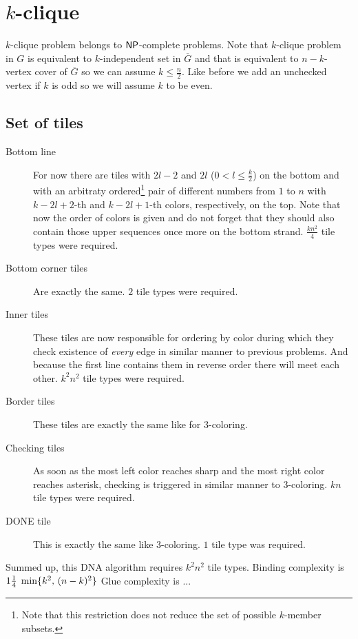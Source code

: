 \section{$k$-clique}


$k$-clique problem belongs to $\mathsf{NP}$-complete problems. Note that $k$-clique problem in $G$ is equivalent to $k$-independent set in $\overline{G}$ and that is equivalent to $n-k$-vertex cover of $\overline{G}$ so we can assume $k \leq \frac{n}{2}$. Like before we add an unchecked vertex if $k$ is odd so we will assume $k$ to be even. %

\subsection*{Set of tiles}

\begin{description}
	\item[Bottom line] For now there are tiles with $2l-2$ and $2l$ ($0 < l \leq \frac{k}{2}$) on the bottom and with an arbitraty ordered\footnote{Note that this restriction does not reduce the set of possible $k$-member subsets.} pair of different numbers from $1$ to $n$ with $k-2l+2$-th and $k-2l+1$-th colors, respectively, on the top. Note that now the order of colors is given and do not forget that they should also contain those upper sequences once more on the bottom strand. $\frac{kn^2}{4}$ tile types were required. %
	\item[Bottom corner tiles] Are exactly the same. $2$ tile types were required.
	\item[Inner tiles] These tiles are now responsible for ordering by color during which they check existence of {\em every} edge in similar manner to previous problems. And because the first line contains them in reverse order there will meet each other. $k^2 n^2$ tile types were required. %
	\item[Border tiles] These tiles are exactly the same like for 3-coloring.
	\item[Checking tiles] As soon as the most left color reaches sharp and the most right color reaches asterisk, checking is triggered in similar manner to 3-coloring. $kn$ tile types were required.
	\item[DONE tile] This is exactly the same like 3-coloring. $1$ tile type was required.
\end{description}
Summed up, this DNA algorithm requires $k^2 n^2$ tile types. Binding complexity is $1\nicefrac{1}{4}\;\min\{k^2,\,(n-k)^2\}$ Glue complexity is ... %

